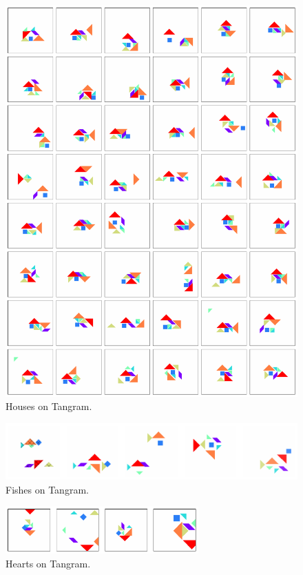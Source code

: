 \begin{figure}[h]
    \centering
    \includegraphics[width=\textwidth]{images/curation_house.pdf}
    \caption{Houses on Tangram.}
    \label{fig:curation_house}
\end{figure}

\begin{figure}[h]
    \centering
    \includegraphics[width=\textwidth]{images/curation_fish.pdf}
    \caption{Fishes on Tangram.}
    \label{fig:curation_fish}
\end{figure}

\begin{figure}[h]
    \centering
    \includegraphics[width=0.66\textwidth]{images/curation_heart.pdf}
    \caption{Hearts on Tangram.}
    \label{fig:curation_heart}
\end{figure}


